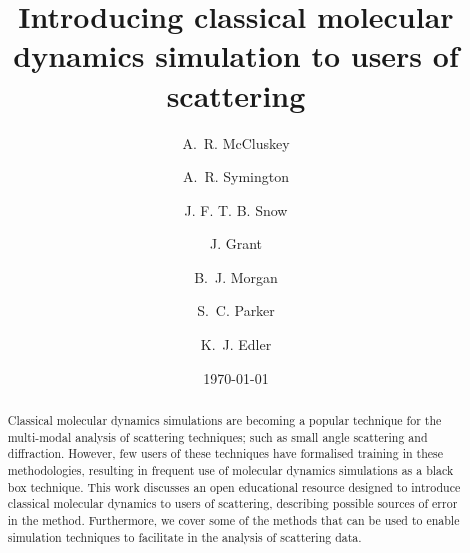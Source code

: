 \documentclass[amsmath,amssymb,twocolumn,superscriptaddress]{revtex4-1}
\begin{document}

\title{Introducing classical molecular dynamics simulation to users of
scattering}

\author{A.~R. McCluskey}

\author{A.~R. Symington}

\author{J. F. T. B. Snow}

\author{J. Grant}

\author{B.~J. Morgan}

\author{S.~C. Parker}

\author{K.~J. Edler}

\date{\today}

\begin{abstract}
Classical molecular dynamics simulations are becoming a popular technique for the multi-modal analysis of scattering techniques; such as small angle scattering and diffraction.
However, few users of these techniques have formalised training in these methodologies, resulting in frequent use of molecular dynamics simulations as a black box technique.
This work discusses an open educational resource designed to introduce classical molecular dynamics to users of scattering, describing possible sources of error in the method.
Furthermore, we cover some of the methods that can be used to enable simulation techniques to facilitate in the analysis of scattering data.
\end{abstract}

\maketitle                        %
\end{document}
